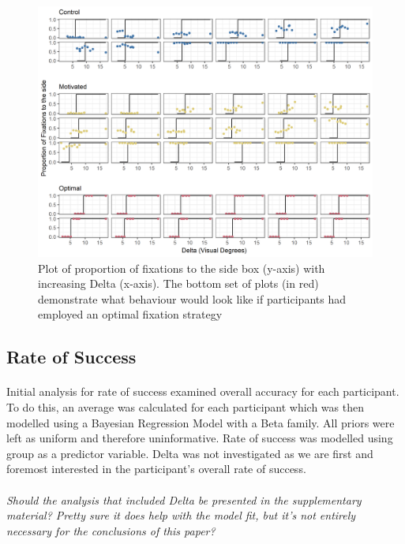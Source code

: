 \documentclass[12pt]{article}
\begin{document}
\begin{figure}[ht!]
	\includegraphics[scale=0.7]{../Figures/Part_2_all_groups.png}
	\centering
	\captionsetup{justification=centering}
	\caption{Plot of proportion of fixations to the side box (y-axis) with increasing Delta (x-axis). The bottom set of plots (in red) demonstrate what behaviour would look like if participants had employed an optimal fixation strategy}
	\label{fig:Position_raw}
\end{figure}

\subsection*{Rate of Success} 
\paragraph{} Initial analysis for rate of success examined overall accuracy for each participant. To do this, an average was calculated for each participant which was then modelled using a Bayesian Regression Model with a Beta family. All priors were left as uniform and therefore uninformative. Rate of success was modelled using group as a predictor variable. Delta was not investigated as we are first and foremost interested in the participant's overall rate of success. 

\paragraph{} \textit{Should the analysis that included Delta be presented in the supplementary material? Pretty sure it does help with the model fit, but it's not entirely necessary for the conclusions of this paper?}
\end{document}
